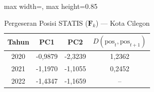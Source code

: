 \begin{table}[H]
\centering
\caption{Pergeseran Posisi STATIS ($\mathbf{F}_k$) --- Kota Cilegon} \label{tab:sample1jarak_statis_skor_kota_cilegon}
\begin{adjustbox}{max width=\textwidth, max height=0.85\textheight}
\begin{tabular}{|c|c|c|c|}
\hline
\textbf{Tahun} & \textbf{PC1} & \textbf{PC2} & \textbf{$D(\text{pos}_t, \text{pos}_{t+1})$} \\
\hline
2020 & -0,9879 & -2,3239 & 1,2362 \\
2021 & -1,1970 & -1,1055 & 0,2452 \\
2022 & -1,4347 & -1,1659 & -- \\
\hline
\end{tabular}
\end{adjustbox}
\end{table}